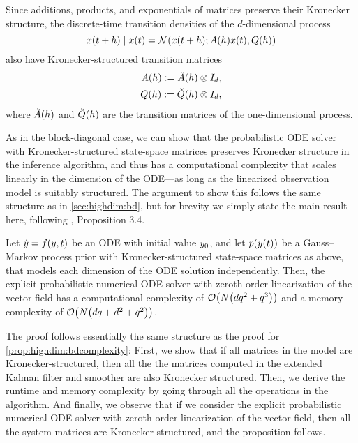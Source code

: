 \documentclass{mimosis}
\begin{document}
Since additions, products, and exponentials of matrices preserve their Kronecker structure, the discrete-time transition densities of the \(d\)-dimensional process
\begin{equation}
  \st(t+h) \mid \st(t) = \N(\st(t+h); \transA(h) \st(t), \transC(h))
\end{equation}
also have Kronecker-structured transition matrices
\begin{subequations}
\begin{align}
  A(h) := \breve{A}(h) \otimes I_d, \\
  Q(h) := \breve{Q}(h) \otimes I_d,
\end{align}
\end{subequations}
where \(\breve{A}(h)\) and \(\breve{Q}(h)\) are the transition matrices of the one-dimensional process.

As in the block-diagonal case, we can show that the probabilistic ODE solver with Kronecker-structured state-space matrices preserves Kronecker structure in the inference algorithm, and thus has a computational complexity that scales linearly in the dimension of the ODE---as long as the linearized observation model is suitably structured.
The argument to show this follows the same structure as in \cref{sec:highdim:bd},
but for brevity we simply state the main result here, following
\highdim{}, Proposition 3.4.

\begin{proposition}
Let \(\dot{\val} = \vf(\val, t)\) be an ODE with initial value \(y_0\),
and let \(\p( \val(t) )\) be a Gauss--Markov process prior with Kronecker-structured state-space matrices as above, that models each dimension of the ODE solution independently.
Then, the explicit probabilistic numerical ODE solver with zeroth-order linearization of the vector field has a computational complexity of
\(\order{N \left( d q^2 + q^3 \right)}\)
and a memory complexity of
\(\order{N \left( dq + d^2 + q^2 \right)}\).
\label{cor:highdim:kroneckercomplexity}
\end{proposition}

\begin{proofsketch}
The proof follows essentially the same structure as the proof for
\cref{prop:highdim:bdcomplexity}:
First, we show that if all matrices in the model are Kronecker-structured, then all the the matrices computed in the extended Kalman filter and smoother are also Kronecker structured.
Then, we derive the runtime and memory complexity by going through all the operations in the algorithm.
And finally, we observe that if we consider the explicit probabilistic numerical ODE solver with zeroth-order linearization of the vector field, then all the system matrices are Kronecker-structured, and the proposition follows.
\end{proofsketch}
\end{document}
